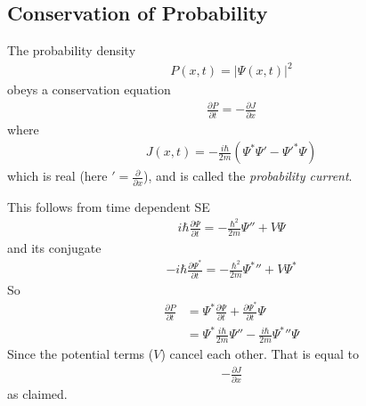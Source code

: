 \documentclass[a4paper]{article}
\begin{document}
\subsection{Conservation of Probability}
The probability density
\begin{equation*}
\begin{aligned}
P\left(x,t\right) = \left|\Psi\left(x,t\right)\right|^2
\end{aligned}
\end{equation*}
obeys a conservation equation
\begin{equation*}
\begin{aligned}
\frac{\partial P}{\partial t} = -\frac{\partial J}{\partial x}
\end{aligned}
\end{equation*}
where
\begin{equation*}
\begin{aligned}
J\left(x,t\right) = -\frac{i\hbar}{2m} \left(\Psi^* \Psi' - \left.\Psi'\right.^* \Psi\right)
\end{aligned}
\end{equation*}
which is real (here $' = \frac{\partial}{\partial x}$), and is called the \emph{probability current}.

This follows from time dependent SE
\begin{equation*}
\begin{aligned}
i\hbar \frac{\partial\Psi}{\partial t} = -\frac{\hbar^2}{2m} \Psi'' + V\Psi
\end{aligned}
\end{equation*}
and its conjugate
\begin{equation*}
\begin{aligned}
-i\hbar \frac{\partial\Psi^*}{\partial t} = -\frac{\hbar^2}{2m} \left.\Psi^*\right.'' + V\Psi^*
\end{aligned}
\end{equation*}
So
\begin{equation*}
\begin{aligned}
\frac{\partial P}{\partial t} &= \Psi^* \frac{\partial \Psi}{\partial t} + \frac{\partial \Psi^*}{\partial t} \Psi \\
&= \Psi^* \frac{i\hbar}{2m} \Psi'' - \frac{i\hbar}{2m} \left.\Psi^*\right.'' \Psi
\end{aligned}
\end{equation*}
Since the potential terms ($V$) cancel each other. That is equal to
\begin{equation*}
\begin{aligned}
-\frac{\partial J}{\partial x}
\end{aligned}
\end{equation*}
as claimed.
\end{document}
